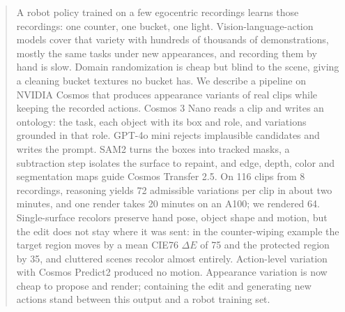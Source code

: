 \begin{abstract}
A robot policy trained on a few egocentric recordings learns those recordings: one counter, one bucket, one light. Vision-language-action models cover that variety with hundreds of thousands of demonstrations, mostly the same tasks under new appearances, and recording them by hand is slow. Domain randomization is cheap but blind to the scene, giving a cleaning bucket textures no bucket has. We describe a pipeline on NVIDIA Cosmos that produces appearance variants of real clips while keeping the recorded actions. Cosmos 3 Nano reads a clip and writes an ontology: the task, each object with its box and role, and variations grounded in that role. GPT-4o mini rejects implausible candidates and writes the prompt. SAM2 turns the boxes into tracked masks, a subtraction step isolates the surface to repaint, and edge, depth, color and segmentation maps guide Cosmos Transfer 2.5. On 116 clips from 8 recordings, reasoning yields 72 admissible variations per clip in about two minutes, and one render takes 20 minutes on an A100; we rendered 64. Single-surface recolors preserve hand pose, object shape and motion, but the edit does not stay where it was sent: in the counter-wiping example the target region moves by a mean CIE76 $\Delta E$ of 75 and the protected region by 35, and cluttered scenes recolor almost entirely. Action-level variation with Cosmos Predict2 produced no motion. Appearance variation is now cheap to propose and render; containing the edit and generating new actions stand between this output and a robot training set.

\end{abstract}
